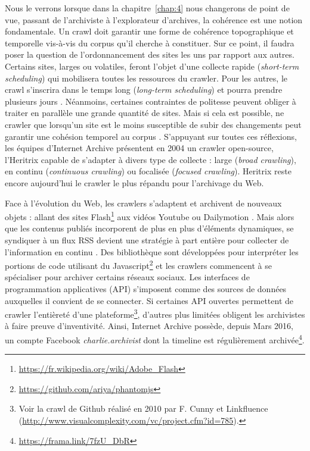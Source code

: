 \documentclass[symmetric,justified,marginals=raggedouter]{tufte-book}
\begin{document}
Nous le verrons lorsque dans la chapitre~\ref{chap:4} nous changerons de point de vue, passant de l'archiviste à l'explorateur d'archives, la cohérence est une notion fondamentale. Un crawl doit garantir une forme de cohérence topographique et temporelle vis-à-vis du corpus qu'il cherche à constituer. Sur ce point, il faudra poser la question de l'ordonnancement des sites les uns par rapport aux autres. Certains sites, larges ou volatiles, feront l'objet d'une collecte rapide (\textit{short-term scheduling}) qui mobilisera toutes les ressources du crawler.  Pour les autres, le crawl s'inscrira dans le temps long (\textit{long-term scheduling}) et pourra prendre plusieurs jours \citep{castillo_scheduling_2004}. Néanmoins, certaines contraintes de politesse peuvent obliger à traiter en parallèle une grande quantité de sites. Mais si cela est possible, ne crawler que lorsqu'un site est le moins susceptible de subir des changements peut garantir une cohésion temporel au corpus \citep{saad_coherence-oriented_2011}. S'appuyant sur toutes ces réflexions, les équipes d'Internet Archive présentent en 2004 un crawler open-source, l'Heritrix \citep{mohr_introduction_2004} capable de s'adapter à divers type de collecte : large (\textit{broad crawling}), en continu (\textit{continuous crawling}) ou focalisée (\textit{focused crawling}). Heritrix reste encore aujourd'hui le crawler le plus répandu pour l'archivage du Web. 

Face à l'évolution du Web, les crawlers s'adaptent et archivent de nouveaux objets : allant des sites Flash\footnote{\RaggedOuter \url{https://fr.wikipedia.org/wiki/Adobe_Flash}} aux vidéos Youtube ou Dailymotion \citep{pop_archiving_2010}. Mais alors que les contenus publiés incorporent de plus en plus d'éléments dynamiques, se syndiquer à un flux RSS devient une stratégie à part entière pour collecter de l'information en continu \citep{oita_archiving_2010}. Des bibliothèque sont développées pour interpréter les portions de code utilisant du Javascript\footnote{\RaggedOuter \url{https://github.com/ariya/phantomjs}} et les crawlers commencent à se spécialiser pour archiver certains réseaux sociaux. Les interfaces de programmation applicatives (API) s'imposent comme des sources de données auxquelles il convient de se connecter. Si certaines API ouvertes permettent de crawler l'entièreté d'une plateforme\footnote{\RaggedOuter Voir la crawl de Github réalisé en 2010 par F. Cunny et Linkfluence (\url{http://www.visualcomplexity.com/vc/project.cfm?id=785}).}, d'autres plus limitées obligent les archivistes à faire preuve d'inventivité. Ainsi, Internet Archive possède, depuis Mars 2016, un compte Facebook \textit{charlie.archivist} dont la timeline est régulièrement archivée\footnote{\RaggedOuter \url{https://frama.link/7fzU_DbR}}. 
\end{document}
